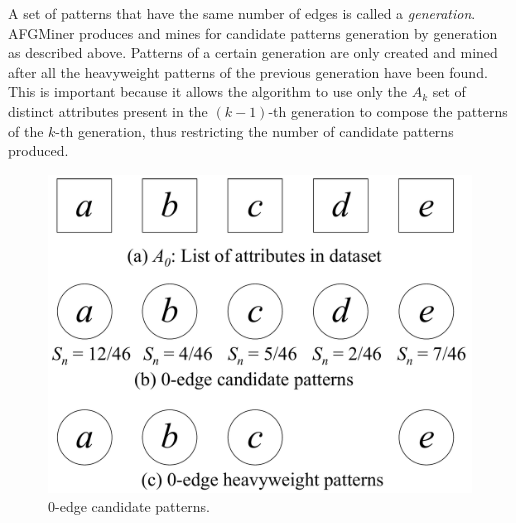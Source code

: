 A set of patterns that have the same number of edges is called a \emph{generation}. AFGMiner produces and mines for candidate patterns generation by generation as described above. Patterns of a certain generation are only created and mined after all the heavyweight patterns of the previous generation have been found. This is important because it allows the algorithm to use only the $A_k$ set of distinct attributes present in the $(k - 1)$-th generation to compose the patterns of the $k$-th generation, thus restricting the number of candidate patterns produced.


\begin{figure}[h!]
\centering
    \includegraphics[scale=0.2]{figures/example_0-edge.pdf}
    \caption{0-edge candidate patterns.}
    \label{fig:example_0-edge}  
\end{figure}

